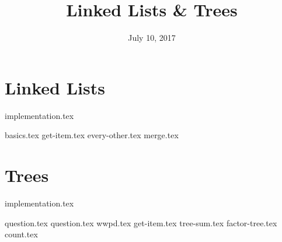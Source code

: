 \documentclass{exam}
\title{Linked Lists \& Trees}
\date{July 10, 2017}
\begin{document}
\maketitle

\section{Linked Lists}
{implementation.tex}
\begin{questions}
{basics.tex}
{get-item.tex}
{every-other.tex}
{merge.tex}
\end{questions}

\clearpage

\section{Trees}
{implementation.tex}
\begin{questions}
{question.tex}
{question.tex}
\marginpar{\vspace*{-1.5in}
           {diagram.tex}}
{wwpd.tex}
{get-item.tex}
\clearpage
{tree-sum.tex}
{factor-tree.tex}
{count.tex}
\end{questions}
\end{document}
